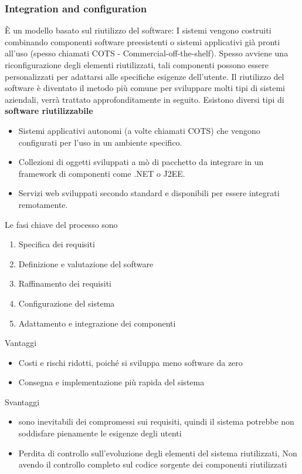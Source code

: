 \documentclass[10pt, letterpaper]{report}
\begin{document}
\subsubsection{Integration and configuration}
È un modello basato sul riutilizzo del software: I sistemi vengono costruiti combinando componenti software preesistenti o sistemi applicativi già pronti all'uso (spesso chiamati COTS - Commercial-off-the-shelf). Spesso avviene una riconfigurazione degli elementi riutilizzati, tali componenti possono essere personalizzati per adattarsi alle specifiche esigenze dell'utente. \acc Il riutilizzo del software è diventato il metodo più comune per sviluppare molti tipi di sistemi aziendali, verrà trattato approfonditamente in seguito. Esistono diversi tipi di \textbf{software riutilizzabile}\begin{itemize}
    \item Sistemi applicativi autonomi (a volte chiamati COTS) che vengono configurati per l'uso in un ambiente specifico.
    \item Collezioni di oggetti sviluppati a mò di pacchetto da integrare in un framework di componenti come .NET o J2EE. 
    \item Servizi web sviluppati secondo standard e disponibili per essere integrati remotamente.
\end{itemize}
Le fasi chiave del processo sono\begin{enumerate}
    \item Specifica dei requisiti 
    \item Definizione e valutazione del software 
    \item Raffinamento dei requisiti 
    \item Configurazione del sistema 
    \item Adattamento e integrazione dei componenti
\end{enumerate}
Vantaggi\begin{itemize}
    \item Costi e rischi ridotti, poiché si sviluppa meno software da zero 
    \item Consegna e implementazione più rapida del sistema
\end{itemize}
Svantaggi\begin{itemize}
    \item  sono inevitabili dei compromessi sui requisiti, quindi il sistema potrebbe non soddisfare pienamente le esigenze degli utenti 
    \item Perdita di controllo sull'evoluzione degli elementi del sistema riutilizzati, Non avendo il controllo completo sul codice sorgente dei componenti riutilizzati
\end{itemize}
\end{document}
